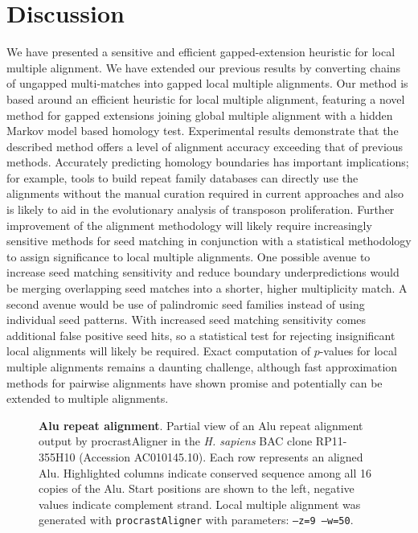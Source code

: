 \documentclass{llncs}
\begin{document}
\section{Discussion}
We have presented a sensitive and efficient gapped-extension heuristic for local
multiple alignment. We have extended our previous results by
converting chains of ungapped multi-matches into gapped local multiple
alignments. Our method is based around an efficient heuristic for
local multiple alignment, featuring a novel method for gapped
extensions joining global multiple alignment with a hidden Markov
model based homology test.  Experimental results demonstrate that the
described method offers a level of alignment accuracy exceeding
that of previous methods. Accurately predicting homology boundaries has important implications; for example, tools to build repeat family databases can directly use the alignments without the manual curation required in current approaches and also is likely to aid in the evolutionary analysis of transposon proliferation.  Further improvement of the alignment
methodology will likely require increasingly sensitive methods for
seed matching in conjunction with a statistical methodology to assign
significance to local multiple alignments.  One possible avenue to
increase seed matching sensitivity and reduce boundary
underpredictions would be merging overlapping seed matches into a
shorter, higher multiplicity match.  A second avenue would be use of
palindromic seed families instead of using individual seed
patterns. With increased seed matching sensitivity comes additional
false positive seed hits, so a statistical test for rejecting
insignificant local alignments will likely be required.  Exact
computation of $p$-values for local multiple alignments remains a
daunting challenge, although fast approximation methods for pairwise
alignments have shown promise\cite{repseek} and potentially can be
extended to multiple alignments\cite{ref-related1,Prakash2005}.
\begin{figure}[t!]
\centering {}
\vspace{-1.0cm}
\caption{\textbf{Alu repeat alignment}. Partial view of an Alu repeat alignment output by procrastAligner in the \emph{H. sapiens} BAC
clone RP11-355H10 (Accession AC010145.10). Each row represents an
aligned Alu. Highlighted columns indicate conserved sequence among all
16 copies of the Alu. Start positions are shown to the left, negative
values indicate complement strand.  Local multiple alignment was
generated with \texttt{procrastAligner} with parameters: \texttt{--z=9
--w=50}.  }
\label{fig-align}
\vspace{-0.3cm}
\end{figure}
\end{document}
